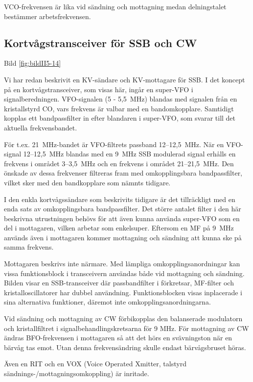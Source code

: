 VCO-frekvensen är lika vid sändning och mottagning medan delningstalet
bestämmer arbetsfrekvensen.

\subsection{Kortvågstransceiver för SSB och CW}

Bild \ref{fig:bildII5-14}

Vi har redan beskrivit en KV-sändare och KV-mottagare för SSB. I det
koncept på en kortvågstransceiver, som visas här, ingår en super-VFO i
signalberedningen. VFO-signalen (5 - 5,5~MHz) blandas med signalen
från en kristallstyrd CO, vars frekvens är valbar med en
bandomkopplare. Samtidigt kopplas ett bandpassfilter in efter
blandaren i super-VFO, som svarar till det aktuella frekvensbandet.

För t.ex. 21~MHz-bandet är VFO-filtrets passband 12--12,5~MHz. När en
VFO-signal 12--12,5~MHz blandas med en 9~MHz SSB modulerad signal
erhålls en frekvens i området 3--3,5~MHz och en frekvens i området
21--21,5~MHz. Den önskade av dessa frekvenser filtreras fram med
omkopplingsbara bandpassfilter, vilket sker med den bandkopplare som
nämnts tidigare.

I den enkla kortvågssändare som beskrivits tidigare är det
tillräckligt med en enda sats av omkopplingsbara bandpassfilter. Det
större antalet filter i den här beskrivna utrustningen behövs för att
även kunna använda super-VFO som en del i mottagaren, vilken arbetar
som enkelsuper. Eftersom en MF på 9~MHz används även i mottagaren
kommer mottagning och sändning att kunna ske på samma frekvens.

Mottagaren beskrivs inte närmare. Med lämpliga omkopplingsanordningar
kan vissa funktionsblock i transceivern användas både vid mottagning
och sändning. Bilden visar en SSB-transceiver där passbandfilter i
förkretsar, MF-filter och kristalloscillatorer har dubbel
användning. Funktionsblocken visas inplacerade i sina alternativa
funktioner, däremot inte omkopplingsanordningarna.

Vid sändning och mottagning av CW förbikopplas den balanserade
modulatorn och kristallfiltret i signalbehandlingskretsarna för 9
MHz. För mottagning av CW ändras BFO-frekvensen i mottagaren så att
det hörs en svävningston när en bärvåg tas emot. Utan denna
frekvensändring skulle endast bärvågsbruset höras.

Även en RIT och en VOX (Voice Operated Xmitter, talstyrd
sändnings-/mottagningsomkoppling) är inritade.

